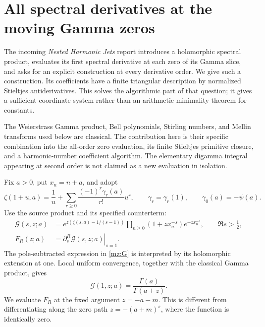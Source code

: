 
\section{All spectral derivatives at the moving Gamma zeros}
\label{mz:sec:zeros}\label{sec:roots}

The incoming \emph{Nested Harmonic Jets} report \cite{nested} introduces a holomorphic
spectral product, evaluates its first spectral derivative at each zero of
its Gamma slice, and asks for an explicit construction at every derivative
order. We give such a construction. Its coefficients have a finite
triangular description by normalized Stieltjes antiderivatives. This solves
the algorithmic part of that question; it gives a sufficient coordinate
system rather than an arithmetic minimality theorem for constants.

The Weierstrass Gamma product, Bell polynomials, Stirling numbers, and
Mellin transforms used below are classical. The contribution here is their
specific combination into the all-order zero evaluation, its finite
Stieltjes primitive closure, and a harmonic-number coefficient algorithm.
The elementary digamma integral appearing at second order is not claimed
as a new evaluation in isolation.

Fix $a>0$, put $x_n=n+a$, and adopt
\[
 \zeta(1+u,a)=\frac1u+
       \sum_{r\ge0}\frac{(-1)^r\gamma_r(a)}{r!}u^r,
 \qquad \gamma_r=\gamma_r(1),\qquad \gamma_0(a)=-\psi(a).
\]
Use the source product and its specified counterterm:
\begin{align}
 \mathcal G(s,z;a)
 &=e^{z(\zeta(s,a)-1/(s-1))}
       \prod_{n\ge0}(1+zx_n^{-s})e^{-zx_n^{-s}},
       \qquad \Re s>\tfrac12,\label{mz:G}\\
 F_R(z;a)&=\left.\partial_s^R\mathcal G(s,z;a)\right|_{s=1}.
 \label{mz:F}
\end{align}
The pole-subtracted expression in \eqref{mz:G} is interpreted by its
holomorphic extension at one. Local uniform convergence, together with the
classical Gamma product, gives
\[
 \mathcal G(1,z;a)=\frac{\Gamma(a)}{\Gamma(a+z)}.
\]
We evaluate $F_R$ at the fixed argument $z=-a-m$. This is different from
differentiating along the zero path $z=-(a+m)^s$, where the function is
identically zero.

